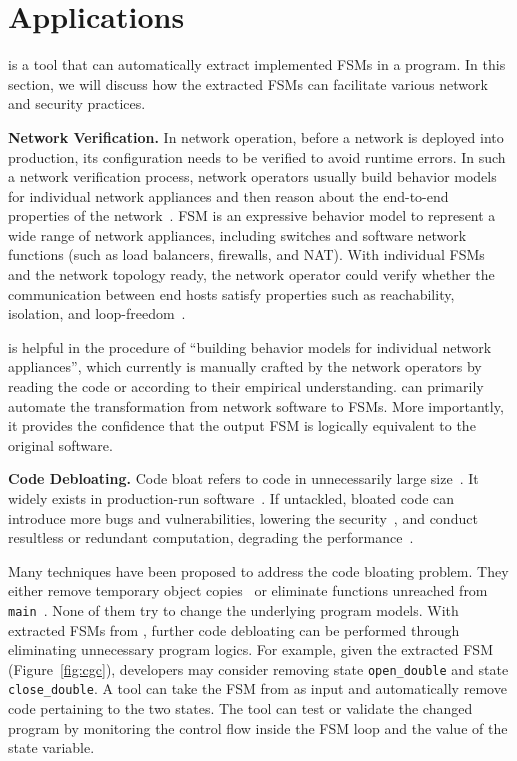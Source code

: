 
\section{Applications}
\label{sec:app}

\Tool{} is a tool that can automatically extract implemented FSMs in a program. 
In this section, we will discuss how the extracted FSMs can facilitate 
various network and security practices.  


\noindent\textbf{Network Verification.}  In network operation, before a network 
is deployed into production, its configuration needs to be verified to avoid 
runtime errors. In such a network verification process, network operators 
usually build behavior models for individual network appliances and then 
reason about the end-to-end properties of the 
network~\cite{mai2011debugging,khurshid2013veriflow,kazemian2012header,kazemian2013real,fayaz2016buzz,panda2017verifying}. 
FSM is an expressive 
behavior model to represent a wide range of network appliances, including 
switches and software network functions (such as load balancers, firewalls, 
and NAT). With individual FSMs and the network topology ready, the network 
operator could verify whether the communication between end hosts satisfy 
properties such as reachability, isolation, and loop-freedom~\cite{xxx}.

\Tool{} is helpful in the procedure of ``building behavior models for 
individual network appliances'', which currently is manually crafted by 
the network operators by reading the code or according to their 
empirical understanding. \Tool{} can primarily automate the 
transformation from network software to FSMs. More importantly, it 
provides the confidence that the output FSM is logically equivalent 
to the original software.


\noindent\textbf{Code Debloating.}
Code bloat refers to code in unnecessarily large size~\cite{code-bloat}.
It widely exists in production-run software~\cite{code-bloat-study}. 
If untackled, bloated code can introduce more bugs and vulnerabilities, 
lowering the security~\cite{protocol-mao}, 
and conduct resultless or redundant computation, 
degrading the performance~\cite{BloatFSE2008,XuBloatPLDI2009,XuBloatPLDI2010}. 

Many techniques have been proposed to address the code bloating problem. 
They either remove temporary object copies~\cite{BloatFSE2008,XuBloatPLDI2009,
XuBloatPLDI2010,Reusable,Cachetor} 
or eliminate functions unreached from 
\texttt{main}~\cite{container-debloating-1, 
container-debloating-2, dinghao-1}. 
None of them try to change the underlying program models.
With extracted FSMs from \Tool{}, 
further code debloating can be performed through
eliminating unnecessary program logics. 
For example, given the extracted FSM (Figure~\ref{fig:cgc}), 
developers may consider removing state \texttt{open\_double} and 
state \texttt{close\_double}. 
A tool can take the FSM from \Tool{} as input and automatically 
remove code pertaining to the two states. 
The tool can test or validate the changed program 
by monitoring the control flow 
inside the FSM loop and the value of the state variable.

